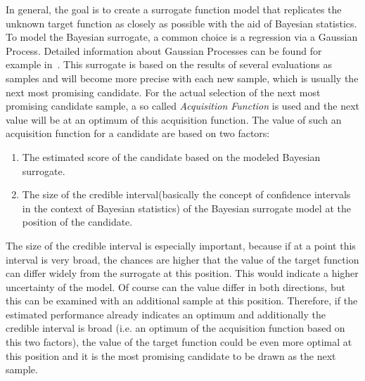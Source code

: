 In general, the goal is to create a surrogate function model that replicates the unknown target function as closely as possible with the aid of Bayesian statistics.
To model the Bayesian surrogate, a common choice is a regression via a Gaussian Process.
Detailed information about Gaussian Processes can be found for example in~\cite{Rasmussen-Gaussian-Processes}.\newline
This surrogate is based on the results of several evaluations as samples and will become more precise with each new sample, which is usually the next most promising candidate.
For the actual selection of the next most promising candidate sample, a so called \textit{Acquisition Function} is used and the next value will be at an optimum of this acquisition function.
The value of such an acquisition function for a candidate are based on two factors:
\begin{enumerate}
    \item The estimated score of the candidate based on the modeled Bayesian surrogate.
    \item The size of the credible interval(basically the concept of confidence intervals in the context of Bayesian statistics) of the Bayesian surrogate model at the position of the candidate.
\end{enumerate}
The size of the credible interval is especially important, because if at a point this interval is very broad, the chances are higher that the value of the target function can differ widely from the surrogate at this position.
This would indicate a higher uncertainty of the model.
Of course can the value differ in both directions, but this can be examined with an additional sample at this position.
Therefore, if the estimated performance already indicates an optimum and additionally the credible interval is broad (i.e. an optimum of the acquisition function based on this two factors), the value of the target function could be even more optimal at this position and it is the most promising candidate to be drawn as the next sample.

